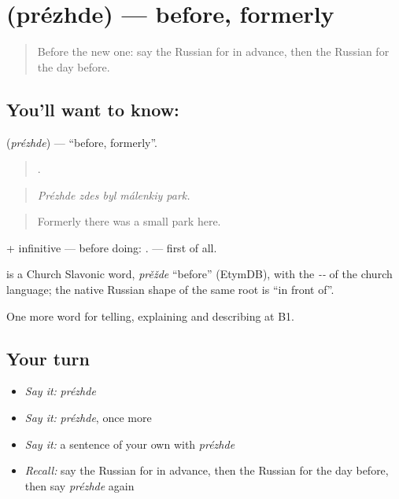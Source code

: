 \section[\texorpdfstring{\ru{прежде} (prézhde)}{прежде (prézhde)}]{ (prézhde) — before, formerly}

\label{lesson:RU-C272-prezhde}



\begin{quote}
Before the new one: say the Russian for in advance, then the Russian for the day before.
\end{quote}

\subsection*{You'll want to know: }
\textbf{} (\emph{prézhde}) — \textquotedblleft{}before, formerly\textquotedblright{}.

\begin{quote}
    .
\end{quote}

\begin{quote}
\emph{Prézhde zdes byl málenkiy park.}
\end{quote}

\begin{quote}
Formerly there was a small park here.
\end{quote}

\emph{ } + infinitive — before doing: \emph{  }. \emph{ } — first of all.

\begin{cousinweb}
\emph{} is a Church Slavonic word, \emph{prěžde} \textquotedblleft{}before\textquotedblright{} (EtymDB), with the \emph{--} of the church language; the native Russian shape of the same root is \emph{} \textquotedblleft{}in front of\textquotedblright{}.
\end{cousinweb}

\begin{grammarlens}[title={What you've built}]
One more word for telling, explaining and describing at B1.
\end{grammarlens}

\subsection*{Your turn}
\begin{itemize}
\raggedright
  \item \emph{Say it:} \emph{prézhde}
  \item \emph{Say it:} \emph{prézhde}, once more
  \item \emph{Say it:} a sentence of your own with \emph{prézhde}
  \item \emph{Recall:} say the Russian for in advance, then the Russian for the day before, then say \emph{prézhde} again
\end{itemize}

